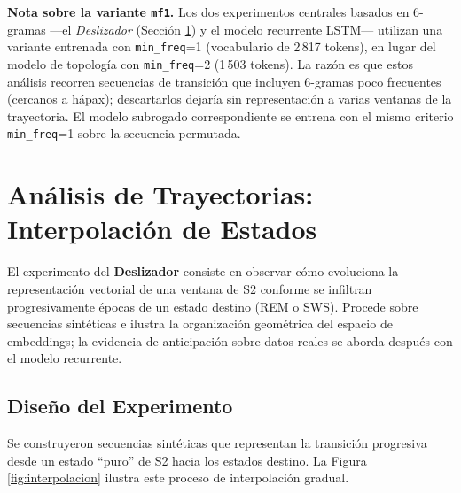 \textbf{Nota sobre la variante \texttt{mf1}.} Los dos experimentos centrales basados en 6-gramas ---el \emph{Deslizador} (Sección \ref{sec:deslizador_metodo}) y el modelo recurrente LSTM--- utilizan una variante entrenada con \texttt{min\_freq}=1 (vocabulario de 2\,817 tokens), en lugar del modelo de topología con \texttt{min\_freq}=2 (1\,503 tokens). La razón es que estos análisis recorren secuencias de transición que incluyen 6-gramas poco frecuentes (cercanos a hápax); descartarlos dejaría sin representación a varias ventanas de la trayectoria. El modelo subrogado correspondiente se entrena con el mismo criterio \texttt{min\_freq}=1 sobre la secuencia permutada.

\section{Análisis de Trayectorias: Interpolación de Estados}
\label{sec:deslizador_metodo}

El experimento del \textbf{Deslizador} consiste en observar cómo evoluciona la representación vectorial de una ventana de S2 conforme se infiltran progresivamente épocas de un estado destino (REM o SWS). Procede sobre secuencias sintéticas e ilustra la organización geométrica del espacio de embeddings; la evidencia de anticipación sobre datos reales se aborda después con el modelo recurrente.

\subsection{Diseño del Experimento}

Se construyeron secuencias sintéticas que representan la transición progresiva desde un estado ``puro'' de S2 hacia los estados destino. La Figura \ref{fig:interpolacion} ilustra este proceso de interpolación gradual.

